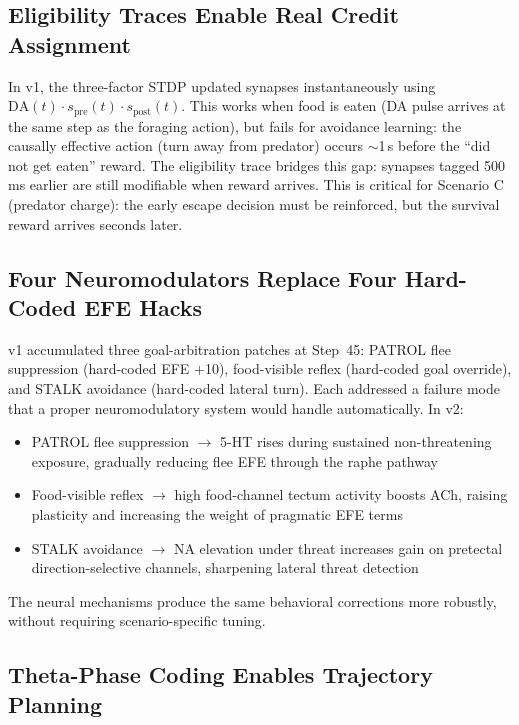 \documentclass[11pt,a4paper]{article}
\begin{document}
\subsection{Eligibility Traces Enable Real Credit Assignment}

In v1, the three-factor STDP updated synapses instantaneously using
$\text{DA}(t) \cdot s_\text{pre}(t) \cdot s_\text{post}(t)$.
This works when food is eaten (DA pulse arrives at the same step as the
foraging action), but fails for avoidance learning: the causally effective
action (turn away from predator) occurs $\sim$1\,s before the
``did not get eaten'' reward.
The eligibility trace bridges this gap: synapses tagged 500\,ms earlier
are still modifiable when reward arrives.
This is critical for Scenario C (predator charge): the early escape
decision must be reinforced, but the survival reward arrives seconds later.

\subsection{Four Neuromodulators Replace Four Hard-Coded EFE Hacks}

v1 accumulated three goal-arbitration patches at Step~45:
PATROL flee suppression (hard-coded EFE +10), food-visible reflex
(hard-coded goal override), and STALK avoidance (hard-coded lateral turn).
Each addressed a failure mode that a proper neuromodulatory system would
handle automatically.
In v2:
\begin{itemize}[nosep]
  \item PATROL flee suppression $\to$ 5-HT rises during sustained non-threatening
    exposure, gradually reducing flee EFE through the raphe pathway
  \item Food-visible reflex $\to$ high food-channel tectum activity boosts ACh,
    raising plasticity and increasing the weight of pragmatic EFE terms
  \item STALK avoidance $\to$ NA elevation under threat increases gain on
    pretectal direction-selective channels, sharpening lateral threat detection
\end{itemize}
The neural mechanisms produce the same behavioral corrections more robustly,
without requiring scenario-specific tuning.

\subsection{Theta-Phase Coding Enables Trajectory Planning}
\end{document}
